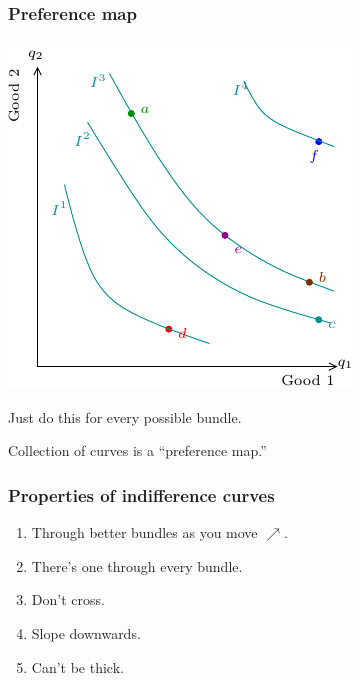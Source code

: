 \documentclass[xcolor=pdftex,dvipsnames]{beamer}
\begin{document}
\begin{frame}
\frametitle{Preference map}
\begin{center}
\includegraphics{pics/PrefMap}
\end{center}
Just do this for every possible bundle.
\bigskip

Collection of curves is a ``preference map.''
\end{frame}

\begin{frame}
\frametitle{Properties of indifference curves}
\begin{enumerate}[<+->]
\item Through better bundles as you move $\nearrow$.
\item There's one through every bundle.
\item Don't cross.
\item Slope downwards. 
\item Can't be thick.
\end{enumerate}
\end{frame}
\end{document}
